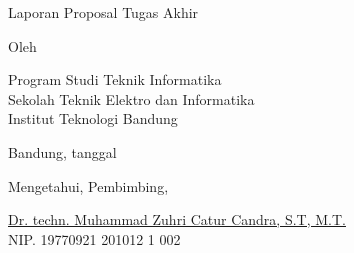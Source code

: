 \clearpage
\pagestyle{empty}

\begin{center}
	\smallskip

	\Large \bfseries \MakeUppercase{\thetitle}
	\vfill

	\Large Laporan Proposal Tugas Akhir
	\vfill

	\large Oleh

	\Large \theauthor

	\large Program Studi Teknik Informatika \\

	\normalsize \normalfont
	Sekolah Teknik Elektro dan Informatika \\
	Institut Teknologi Bandung \\

	\vfill
	\normalsize \normalfont

	Bandung, tanggal \tanggalpengesahan

	\vspace{0.5cm}
	Mengetahui,\break
	Pembimbing,

	\vfill
	\underline{Dr. techn. Muhammad Zuhri Catur Candra, S.T, M.T.
	} \\
	NIP. 19770921 201012 1 002

\end{center}
\clearpage
